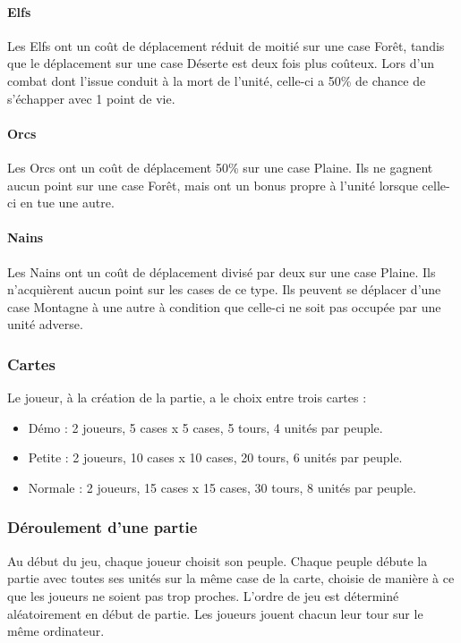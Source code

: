 \documentclass[a4paper]{article}
\begin{document}
\paragraph{Elfs} Les Elfs ont un coût de déplacement réduit de moitié sur une case Forêt, tandis que le déplacement sur une case Déserte est deux fois plus coûteux. Lors d'un combat dont l'issue conduit à la mort de l'unité, celle-ci a 50\% de chance de s'échapper avec 1 point de vie.
\paragraph{Orcs} Les Orcs ont un coût de déplacement 50\% sur une case Plaine. Ils ne gagnent aucun point sur une case Forêt, mais ont un bonus propre à l'unité lorsque celle-ci en tue une autre.
\paragraph{Nains} Les Nains ont un coût de déplacement divisé par deux sur une case Plaine. Ils n'acquièrent aucun point sur les cases de ce type. Ils peuvent se déplacer d'une case Montagne à une autre à condition que celle-ci ne soit pas occupée par une unité adverse.

		\subsubsection{Cartes}
Le joueur, à la création de la partie, a le choix entre trois cartes :
\begin{itemize}
\item Démo : 2 joueurs, 5 cases x 5 cases, 5 tours, 4 unités par peuple.
\item Petite : 2 joueurs, 10 cases x 10 cases, 20 tours, 6 unités par peuple.
\item Normale : 2 joueurs, 15 cases x 15 cases, 30 tours, 8 unités par peuple.
\end{itemize}

		\subsubsection{Déroulement d'une partie}
Au début du jeu, chaque joueur choisit son peuple. Chaque peuple débute la partie avec toutes ses unités sur la même case de la carte, choisie de manière à ce que les joueurs ne soient pas trop proches. L’ordre de jeu est déterminé aléatoirement en début de partie. Les joueurs jouent chacun leur tour sur le même ordinateur.
\end{document}
